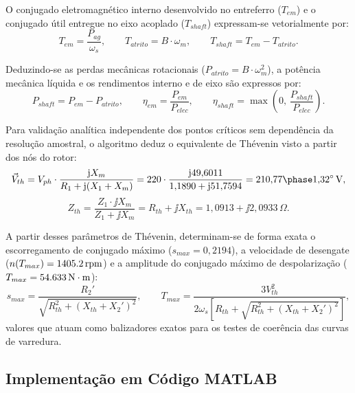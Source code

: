 O conjugado eletromagnético interno desenvolvido no entreferro ($T_{em}$) e o conjugado útil entregue no eixo acoplado ($T_{shaft}$) expressam-se vetorialmente por:
\begin{equation}
T_{em} = \frac{P_{ag}}{\omega_s}, \qquad T_{atrito} = B \cdot \omega_m, \qquad T_{shaft} = T_{em} - T_{atrito}.
\label{eq:conjugados_vetoriais}
\end{equation}

Deduzindo-se as perdas mecânicas rotacionais ($P_{atrito} = B \cdot \omega_m^2$), a potência mecânica líquida e os rendimentos interno e de eixo são expressos por:
\begin{equation}
P_{shaft} = P_{em} - P_{atrito}, \qquad \eta_{em} = \frac{P_{em}}{P_{elec}}, \qquad \eta_{shaft} = \max\left(0, \, \frac{P_{shaft}}{P_{elec}}\right).
\label{eq:rendimentos_vetoriais}
\end{equation}

Para validação analítica independente dos pontos críticos sem dependência da resolução amostral, o algoritmo deduz o equivalente de Thévenin visto a partir dos nós do rotor:
\begin{equation}
\vec{V}_{th} = V_{ph} \cdot \frac{\jj X_m}{R_1 + \jj (X_1 + X_m)} = 220 \cdot \frac{\jj 49{,}6011}{1{,}1890 + \jj 51{,}7594} = \phasor{210{,}77}{1{,}32}\,\text{V},
\label{eq:v_thevenin_valor}
\end{equation}
\begin{equation}
Z_{th} = \frac{Z_1 \cdot \jj X_m}{Z_1 + \jj X_m} = R_{th} + \jj X_{th} = 1{,}0913 + \jj 2{,}0933\,\Omega.
\label{eq:z_thevenin_valor}
\end{equation}

A partir desses parâmetros de Thévenin, determinam-se de forma exata o escorregamento de conjugado máximo ($s_{max} = 0{,}2194$), a velocidade de desengate ($n(T_{max}) = \SI{1405,2}{\mathrm{rpm}}$) e a amplitude do conjugado máximo de despolarização ($T_{max} = \SI{54,633}{\mathrm{N\cdot m}}$):
\begin{equation}
s_{max} = \frac{R_2'}{\sqrt{R_{th}^2 + (X_{th} + X_2')^2}}, \qquad T_{max} = \frac{3 V_{th}^2}{2\omega_s \left[ R_{th} + \sqrt{R_{th}^2 + (X_{th} + X_2')^2} \right]},
\label{eq:tmax_thevenin_geral}
\end{equation}
valores que atuam como balizadores exatos para os testes de coerência das curvas de varredura.

\subsection{Implementação em Código MATLAB}\label{subsec:implementacao_script}

